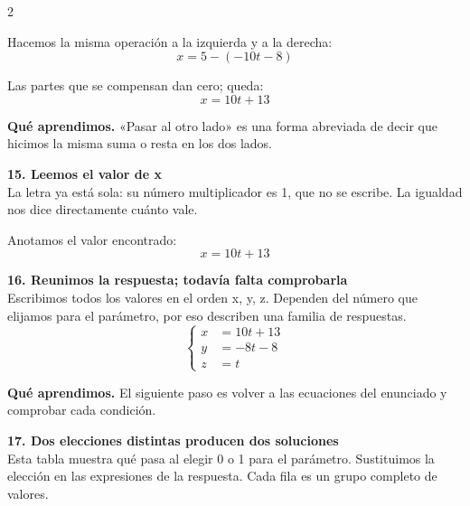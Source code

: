 \documentclass[11pt,a4paper,landscape]{article}
\begin{document}
\begin{multicols*}{2}
\begin{minipage}{\linewidth}
\par\smallskip Hacemos la misma operación a la izquierda y a la derecha:
\[x=5-\left(- 10 t - 8\right)\]
\par\smallskip Las partes que se compensan dan cero; queda:
\[x=10 t + 13\]
\par\smallskip\textbf{Qué aprendimos.} «Pasar al otro lado» es una forma abreviada de decir que hicimos la misma suma o resta en los dos lados.
\end{minipage}\par\medskip
\noindent\begin{minipage}{\linewidth}\textbf{15. Leemos el valor de x}\\[2pt]La letra ya está sola: su número multiplicador es 1, que no se escribe. La igualdad nos dice directamente cuánto vale.
\par\smallskip Anotamos el valor encontrado:
\[x=10 t + 13\]
\end{minipage}\par\medskip
\noindent\begin{minipage}{\linewidth}\textbf{16. Reunimos la respuesta; todavía falta comprobarla}\\[2pt]Escribimos todos los valores en el orden x, y, z. Dependen del número que elijamos para el parámetro, por eso describen una familia de respuestas.
\[\left\{\begin{aligned}x&=10 t + 13\\y&=- 8 t - 8\\z&=t\end{aligned}\right.\]
\par\smallskip\textbf{Qué aprendimos.} El siguiente paso es volver a las ecuaciones del enunciado y comprobar cada condición.
\end{minipage}\par\medskip
\noindent\begin{minipage}{\linewidth}\textbf{17. Dos elecciones distintas producen dos soluciones}\\[2pt]Esta tabla muestra qué pasa al elegir 0 o 1 para el parámetro. Sustituimos la elección en las expresiones de la respuesta. Cada fila es un grupo completo de valores.
\par{}\par\smallskip

\end{minipage}
\end{multicols*}
\end{document}
